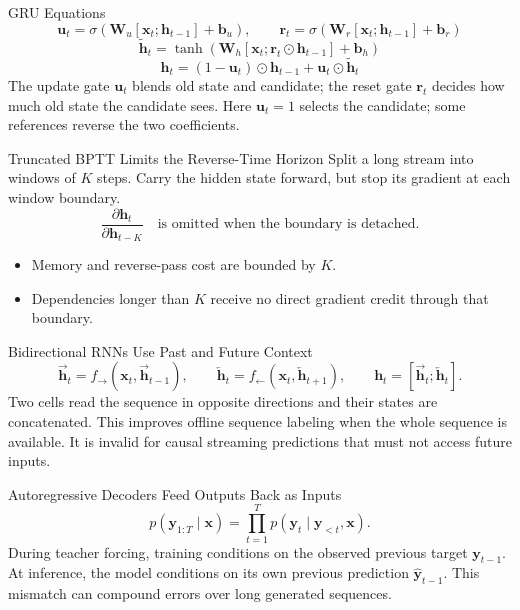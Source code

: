 \documentclass{ntuabeamer}
\begin{document}
\begin{frame}{GRU Equations}
  \[
    \mathbf{u}_t=\sigma(\mathbf{W}_u[\mathbf{x}_t;\mathbf{h}_{t-1}]+\mathbf{b}_u),
    \qquad
    \mathbf{r}_t=\sigma(\mathbf{W}_r[\mathbf{x}_t;\mathbf{h}_{t-1}]+\mathbf{b}_r)
  \]
  \[
    \widetilde{\mathbf{h}}_t
    =\tanh\!\left(\mathbf{W}_h
      [\mathbf{x}_t;\mathbf{r}_t\odot\mathbf{h}_{t-1}]+\mathbf{b}_h\right)
  \]
  \[
    \boxed{
      \mathbf{h}_t
      =(1-\mathbf{u}_t)\odot\mathbf{h}_{t-1}
      +\mathbf{u}_t\odot\widetilde{\mathbf{h}}_t
    }
  \]
  The update gate $\mathbf u_t$ blends old state and candidate; the reset gate $\mathbf r_t$ decides how much old state the candidate sees.
  Here $\mathbf u_t=1$ selects the candidate; some references reverse the two coefficients.
\end{frame}

\begin{frame}{Truncated BPTT Limits the Reverse-Time Horizon}
  Split a long stream into windows of $K$ steps. Carry the hidden state forward, but stop its gradient at each window boundary.
  \[
    \frac{\partial\mathbf h_t}{\partial\mathbf h_{t-K}}
    \quad\text{is omitted when the boundary is detached.}
  \]
  \begin{itemize}
    \item Memory and reverse-pass cost are bounded by $K$.
    \item Dependencies longer than $K$ receive no direct gradient credit through that boundary.
  \end{itemize}
\end{frame}

\begin{frame}{Bidirectional RNNs Use Past and Future Context}
  \[
    \overrightarrow{\mathbf h}_t
      =f_\rightarrow(\mathbf x_t,\overrightarrow{\mathbf h}_{t-1}),
    \qquad
    \overleftarrow{\mathbf h}_t
      =f_\leftarrow(\mathbf x_t,\overleftarrow{\mathbf h}_{t+1}),
    \qquad
    \mathbf h_t=[\overrightarrow{\mathbf h}_t;\overleftarrow{\mathbf h}_t].
  \]
  Two cells read the sequence in opposite directions and their states are concatenated.
  This improves offline sequence labeling when the whole sequence is available.
  It is invalid for causal streaming predictions that must not access future inputs.
\end{frame}

\begin{frame}{Autoregressive Decoders Feed Outputs Back as Inputs}
  \[
    p(\mathbf y_{1:T}\mid\mathbf x)
    =\prod_{t=1}^{T}p(\mathbf y_t\mid\mathbf y_{<t},\mathbf x).
  \]
  During teacher forcing, training conditions on the observed previous target $\mathbf y_{t-1}$.
  At inference, the model conditions on its own previous prediction $\widehat{\mathbf y}_{t-1}$.
  This mismatch can compound errors over long generated sequences.
\end{frame}
\end{document}
